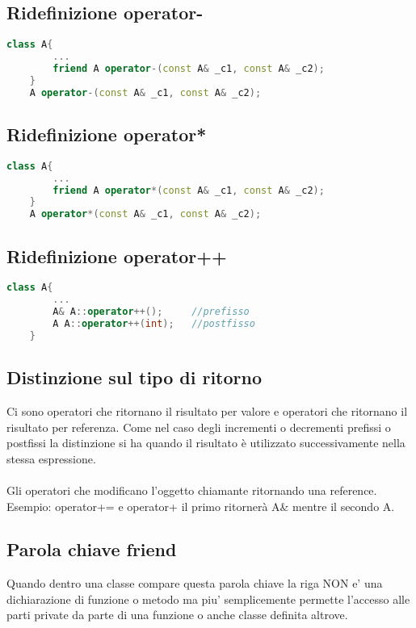 \subsection{Ridefinizione operator-}

\begin{lstlisting}[language=c++]
    class A{
        ...
        friend A operator-(const A& _c1, const A& _c2); 
    }
    A operator-(const A& _c1, const A& _c2); 
\end{lstlisting}
\subsection{Ridefinizione operator*}
\begin{lstlisting}[language=c++]
    class A{
        ...
        friend A operator*(const A& _c1, const A& _c2);
    }
    A operator*(const A& _c1, const A& _c2); 
\end{lstlisting}
\subsection{Ridefinizione operator++}

\begin{lstlisting}[language=c++]
    class A{
        ...
        A& A::operator++();     //prefisso
        A A::operator++(int);   //postfisso
    }
\end{lstlisting}

\subsection{Distinzione sul tipo di ritorno}
Ci sono operatori che ritornano il risultato per valore e
operatori che ritornano il risultato per referenza. Come nel caso degli incrementi o decrementi prefissi o postfissi la distinzione si ha quando il risultato è utilizzato successivamente nella stessa espressione. 
\paragraph{}
Gli operatori che modificano l’oggetto chiamante
ritornando una reference. Esempio: operator+= e
operator+ il primo ritornerà A\& mentre il secondo A.


\subsection{Parola chiave friend}
Quando dentro una classe compare questa parola chiave la
riga NON e’ una dichiarazione di funzione o metodo ma piu’
semplicemente permette l’accesso alle parti private da parte di
una funzione o anche classe definita altrove. 
